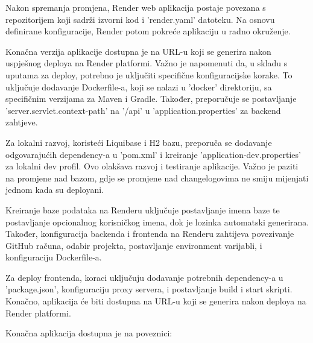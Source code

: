 		Nakon spremanja promjena, Render web aplikacija postaje povezana s repozitorijem koji sadrži izvorni kod i 'render.yaml' datoteku. Na osnovu definirane konfiguracije, Render potom pokreće aplikaciju u radno okruženje.

		Konačna verzija aplikacije dostupna je na URL-u koji se generira nakon uspješnog deploya na Render platformi. Važno je napomenuti da, u skladu s uputama za deploy, potrebno je uključiti specifične konfiguracijske korake. To uključuje dodavanje Dockerfile-a, koji se nalazi u 'docker' direktoriju, sa specifičnim verzijama za Maven i Gradle. Također, preporučuje se postavljanje 'server.servlet.context-path' na '/api' u 'application.properties' za backend zahtjeve.

		Za lokalni razvoj, koristeći Liquibase i H2 bazu, preporuča se dodavanje odgovarajućih dependency-a u 'pom.xml' i kreiranje 'application-dev.properties' za lokalni dev profil. Ovo olakšava razvoj i testiranje aplikacije. Važno je paziti na promjene nad bazom, gdje se promjene nad changelogovima ne smiju mijenjati jednom kada su deployani.

		Kreiranje baze podataka na Renderu uključuje postavljanje imena baze te postavljanje opcionalnog korisničkog imena, dok je lozinka automatski generirana. Također, konfiguracija backenda i frontenda na Renderu zahtijeva povezivanje GitHub računa, odabir projekta, postavljanje environment varijabli, i konfiguraciju Dockerfile-a.

		Za deploy frontenda, koraci uključuju dodavanje potrebnih dependency-a u 'package.json', konfiguraciju proxy servera, i postavljanje build i start skripti. Konačno, aplikacija će biti dostupna na URL-u koji se generira nakon deploya na Render platformi.

		Konačna aplikacija dostupna je na poveznici:

		\eject
